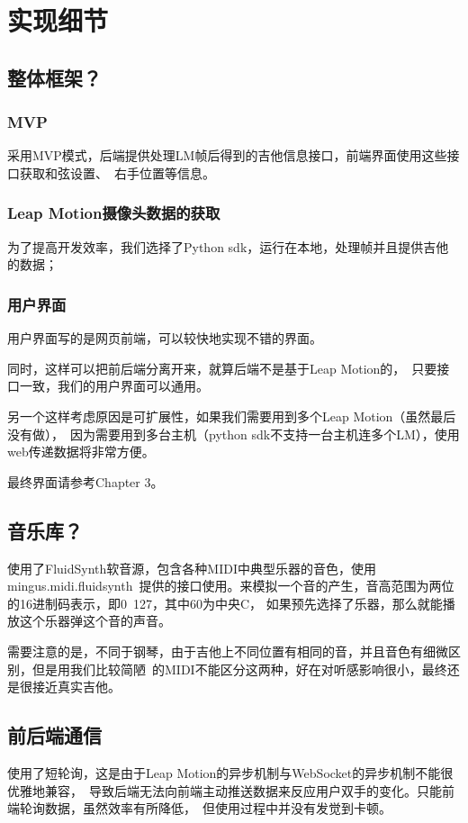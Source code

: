 \chapter{实现细节}

    \section{整体框架？}

        \subsection{MVP}
        采用MVP模式，后端提供处理LM帧后得到的吉他信息接口，前端界面使用这些接口获取和弦设置、\
        右手位置等信息。

        \subsection{Leap Motion摄像头数据的获取}
        为了提高开发效率，我们选择了Python sdk，运行在本地，处理帧并且提供吉他的数据；\

        \subsection{用户界面}
        用户界面写的是网页前端，可以较快地实现不错的界面。\

        同时，这样可以把前后端分离开来，就算后端不是基于Leap Motion的，\
        只要接口一致，我们的用户界面可以通用。

        另一个这样考虑原因是可扩展性，如果我们需要用到多个Leap Motion（虽然最后没有做），\
        因为需要用到多台主机（python sdk不支持一台主机连多个LM），使用web传递数据将非常方便。

        最终界面请参考Chapter 3。


    \section{音乐库？}
    使用了FluidSynth软音源，包含各种MIDI中典型乐器的音色，使用mingus.midi.fluidsynth\
    提供的接口使用。来模拟一个音的产生，音高范围为两位的16进制码表示，即0~127，其中60为中央C，
    如果预先选择了乐器，那么就能播放这个乐器弹这个音的声音。

    需要注意的是，不同于钢琴，由于吉他上不同位置有相同的音，并且音色有细微区别，但是用我们比较简陋\
    的MIDI不能区分这两种，好在对听感影响很小，最终还是很接近真实吉他。

    \section{前后端通信}
    使用了短轮询，这是由于Leap Motion的异步机制与WebSocket的异步机制不能很优雅地兼容，\
    导致后端无法向前端主动推送数据来反应用户双手的变化。只能前端轮询数据，虽然效率有所降低，\
    但使用过程中并没有发觉到卡顿。
